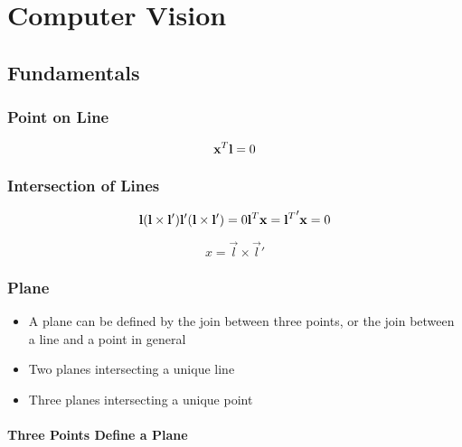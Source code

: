 \chapter{Computer Vision}

\section{Fundamentals}

\subsection{Point on Line}

\begin{equation}
  {{{\mathbf{x}}^{T}}} {\mathbf{l}} = 0
\end{equation}


\subsection{Intersection of Lines}

\begin{equation}
  {\mathbf{l}} ({\mathbf{l}} \times {\mathbf{l}}')
  {\mathbf{l}}' ({\mathbf{l}} \times {\mathbf{l}}')
  = 0 \\
  {{{\mathbf{l}}^{T}}} {\mathbf{x}}
  = {{{\mathbf{l}}^{T}}}' {\mathbf{x}}
  = 0
\end{equation}

\begin{equation}
  x = \Vec{l} \times \Vec{l}'
\end{equation}


\subsection{Plane}

\begin{itemize}
  \item{A plane can be defined by the join between three points, or the join
        between a line and a point in general}
  \item{Two planes intersecting a unique line}
  \item{Three planes intersecting a unique point}
\end{itemize}

\subsubsection{Three Points Define a Plane}

